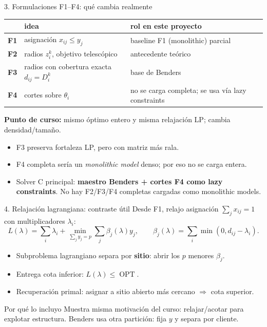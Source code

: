 \documentclass[10pt,aspectratio=169]{beamer}
\DeclareMathOperator*{\OPT}{OPT}
\begin{document}
\begin{frame}{3. Formulaciones F1--F4: qué cambia realmente}
\small
\begin{tabular}{lll}
\toprule
 & idea & rol en este proyecto \\
\midrule
\textbf{F1} & asignación $x_{ij}\le y_j$ & baseline F1 (monolithic) parcial \\
\textbf{F2} & radios $z_i^k$, objetivo telescópico & antecedente teórico \\
\textbf{F3} & radios con cobertura exacta $d_{ij}=D_i^k$ & base de Benders \\
\textbf{F4} & cortes sobre $\theta_i$ & no se carga completa; se usa vía lazy constraints \\
\bottomrule
\end{tabular}
\vfill
\textbf{Punto de curso:} mismo óptimo entero y misma relajación LP; cambia densidad/tamaño.
\vfill
\begin{itemize}
  \item F3 preserva fortaleza LP, pero con matriz más rala.
  \item F4 completa sería un \emph{monolithic model} denso; por eso no se carga entera.
  \item Solver C principal: \textbf{maestro Benders + cortes F4 como lazy constraints}. No hay F2/F3/F4 completas cargadas como monolithic models.
\end{itemize}
\end{frame}

\begin{frame}{4. Relajación lagrangiana: contraste útil}
Desde F1, relajo asignación $\sum_j x_{ij}=1$ con multiplicadores $\lambda_i$:
\[
  L(\lambda)=\sum_i\lambda_i+
  \min_{\sum_j y_j=p}\sum_j \beta_j(\lambda)y_j,
  \qquad
  \beta_j(\lambda)=\sum_i\min(0,d_{ij}-\lambda_i).
\]
\begin{itemize}
  \item Subproblema lagrangiano separa por \textbf{sitio}: abrir los $p$ menores $\beta_j$.
  \item Entrega cota inferior: $L(\lambda)\le \OPT$.
  \item Recuperación primal: asignar a sitio abierto más cercano $\Rightarrow$ cota superior.
\end{itemize}
\begin{block}{Por qué lo incluyo}
Muestra misma motivación del curso: relajar/acotar para explotar estructura. Benders usa otra partición: fija $y$ y separa por cliente.
\end{block}
\end{frame}
\end{document}
